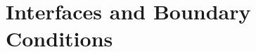 \documentclass{beamer}
\begin{document}
\section{Interfaces and Boundary Conditions}


\end{document}
